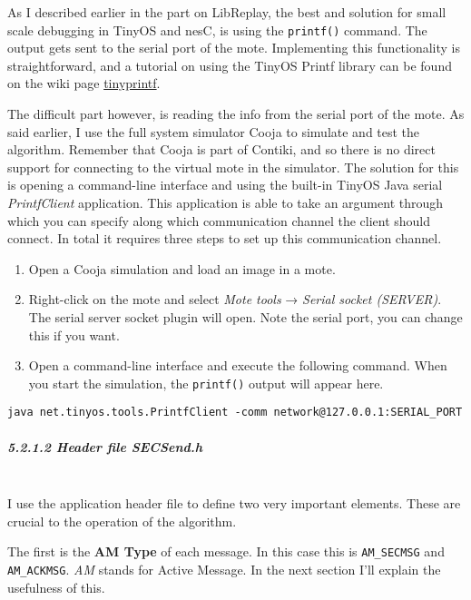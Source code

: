 As I described earlier in the part on LibReplay, the best and solution
for small scale debugging in TinyOS and nesC, is using the
\texttt{printf()} command. The output gets sent to the serial port of
the mote. Implementing this functionality is straightforward, and a
tutorial on using the TinyOS Printf library can be found on the wiki
page
\href{http://tinyos.stanford.edu/tinyos-wiki/index.php/The_TinyOS_printf_Library}{tinyprintf}.

The difficult part however, is reading the info from the serial port of
the mote. As said earlier, I use the full system simulator Cooja to
simulate and test the algorithm. Remember that Cooja is part of Contiki,
and so there is no direct support for connecting to the virtual mote in
the simulator. The solution for this is opening a command-line interface
and using the built-in TinyOS Java serial \emph{PrintfClient}
application. This application is able to take an argument through which
you can specify along which communication channel the client should
connect. In total it requires three steps to set up this communication
channel.

\begin{enumerate}
\def\labelenumi{\arabic{enumi}.}
\itemsep1pt\parskip0pt
\item
  Open a Cooja simulation and load an image in a mote.
\item
  Right-click on the mote and select \emph{Mote tools} → \emph{Serial
  socket (SERVER)}. The serial server socket plugin will open. Note the
  serial port, you can change this if you want.
\item
  Open a command-line interface and execute the following command. When
  you start the simulation, the \texttt{printf()} output will appear
  here.
\end{enumerate}

\begin{verbatim}
java net.tinyos.tools.PrintfClient -comm network@127.0.0.1:SERIAL_PORT
\end{verbatim}

\subparagraph{5.2.1.2 Header file
\emph{SECSend.h}\\\\}\label{header-file-secsend.h}

I use the application header file to define two very important elements.
These are crucial to the operation of the algorithm.

The first is the \textbf{AM Type} of each message. In this case this is
\texttt{AM\_SECMSG} and \texttt{AM\_ACKMSG}. \emph{AM} stands for Active
Message. In the next section I'll explain the usefulness of this.

